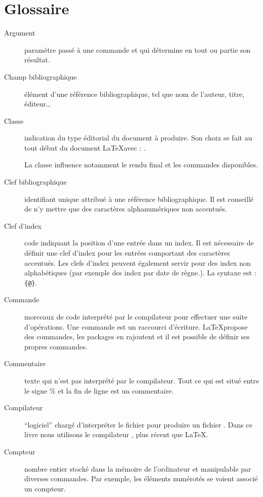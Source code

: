 \chapter{Glossaire}


\begin{description}
\item[Argument] paramètre passé à une commande et qui détermine en tout ou partie son résultat.


\item[Champ bibliographique] élément d'une référence bibliographique, tel que nom de l'auteur, titre, éditeur…


\item[Classe] indication du type éditorial du document à produire. Son choix se fait au tout début du document \LaTeX avec : . 

La classe influence notamment le rendu final et les commandes disponibles.

\item[Clef bibliographique] identifiant unique attribué à une référence bibliographique. Il est conseillé de n'y mettre que des caractères alphanumériques non accentués.

\item[Clef d'index] code indiquant la position d'une entrée dans un index. Il est nécessaire de définir une clef d'index pour les entrées comportant des caractères accentués. Les clefs d'index peuvent également servir pour des index non alphabétiques (par exemple des index par date de règne.). La syntaxe est : \verb|{|\verb|@|\verb|}|.

\item[Commande] morceaux de code  interprété par le compilateur pour effectuer une suite d'opérations. Une commande est un raccourci d'écriture. \LaTeX propose des commandes, les packages en rajoutent et il est possible de définir ses propres commandes.

\item[Commentaire] texte qui n'est pas interprété par le compilateur. Tout ce qui est situé entre le signe \% et la fin de ligne est un commentaire.

\item[Compilateur] \enquote{logiciel} chargé d'interpréter le fichier  pour produire un fichier . Dans ce livre nous utilisons le compilateur \XeLaTeX, plus récent que \LaTeX.

\item[Compteur] nombre entier stocké dans la mémoire de l'ordinateur et manipulable par diverses commandes. Par exemple, les éléments numérotés se voient associé un compteur.



\end{description}
